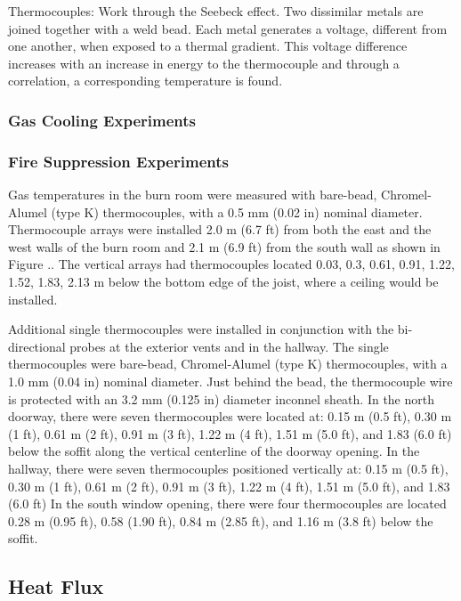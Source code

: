 \documentclass[12pt,oneside]{book}
\begin{document}
Thermocouples:
Work through the Seebeck effect.  Two dissimilar metals are joined together with a weld bead.  Each metal generates a voltage, different from one another, when exposed to a thermal gradient.  This voltage difference increases with an increase in energy to the thermocouple and through a correlation, a corresponding temperature is found.  

\subsubsection{Gas Cooling Experiments}
\label{subsubsec:Gas_Cooling_Temperature_Instrumentation}

\subsubsection{Fire Suppression Experiments}
\label{subsubsec:Fire_Suppression_Temperature_Instrumentation}

Gas temperatures in the burn room were measured with bare-bead, Chromel-Alumel (type K) thermocouples, with a 0.5 mm (0.02 in) nominal diameter.  Thermocouple arrays were installed 2.0 m (6.7 ft) from both the east and the west walls of the burn room and 2.1 m (6.9 ft) from the south wall as shown in Figure ..  The vertical arrays had thermocouples located 0.03, 0.3, 0.61, 0.91, 1.22, 1.52, 1.83, 2.13 m below the bottom edge of the joist, where a ceiling would be installed.   

Additional single thermocouples were installed in conjunction with the bi-directional probes at the exterior vents and in the hallway.  The single thermocouples were bare-bead, Chromel-Alumel (type K) thermocouples, with a 1.0 mm (0.04 in) nominal diameter. Just behind the bead, the thermocouple wire is protected with an 3.2 mm (0.125 in) diameter inconnel sheath.  
In the north doorway, there were seven thermocouples were located at: 0.15 m (0.5 ft), 0.30 m (1 ft), 0.61 m (2 ft), 0.91 m (3 ft), 1.22 m (4 ft), 1.51 m (5.0 ft), and 1.83 (6.0 ft) below the soffit along the vertical centerline of the doorway opening.  In the hallway, there were seven thermocouples positioned vertically at: 0.15 m (0.5 ft), 0.30 m (1 ft), 0.61 m (2 ft), 0.91 m (3 ft), 1.22 m (4 ft), 1.51 m (5.0 ft), and 1.83 (6.0 ft)   In the south window opening, there were four thermocouples are located 0.28 m (0.95 ft), 0.58 (1.90 ft), 0.84 m (2.85 ft), and 1.16 m (3.8 ft) below the soffit.  

\subsection{Heat Flux}
\label{subsec:Heat_Flux}
\end{document}
